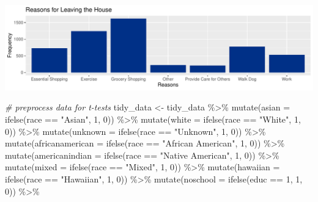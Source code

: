 \documentclass[
  11 pt,
]{article}
\newenvironment{Shaded}{\begin{snugshade}}{\end{snugshade}}
\newcommand{\AttributeTok}[1]{\textcolor[rgb]{0.77,0.63,0.00}{#1}}
\newcommand{\CommentTok}[1]{\textcolor[rgb]{0.56,0.35,0.01}{\textit{#1}}}
\newcommand{\DecValTok}[1]{\textcolor[rgb]{0.00,0.00,0.81}{#1}}
\newcommand{\FunctionTok}[1]{\textcolor[rgb]{0.00,0.00,0.00}{#1}}
\newcommand{\NormalTok}[1]{#1}
\newcommand{\OtherTok}[1]{\textcolor[rgb]{0.56,0.35,0.01}{#1}}
\newcommand{\SpecialCharTok}[1]{\textcolor[rgb]{0.00,0.00,0.00}{#1}}
\newcommand{\StringTok}[1]{\textcolor[rgb]{0.31,0.60,0.02}{#1}}
\begin{document}
\includegraphics{finalreport_template_files/figure-latex/data-analysis-3.pdf}

\begin{Shaded}
\begin{Highlighting}[]
\CommentTok{\# preprocess data for t{-}tests}
\NormalTok{tidy\_data }\OtherTok{\textless{}{-}}\NormalTok{ tidy\_data }\SpecialCharTok{\%\textgreater{}\%}
  \FunctionTok{mutate}\NormalTok{(}\AttributeTok{asian =} \FunctionTok{ifelse}\NormalTok{(race }\SpecialCharTok{==} \StringTok{"Asian"}\NormalTok{, }\DecValTok{1}\NormalTok{, }\DecValTok{0}\NormalTok{)) }\SpecialCharTok{\%\textgreater{}\%}
  \FunctionTok{mutate}\NormalTok{(}\AttributeTok{white =} \FunctionTok{ifelse}\NormalTok{(race }\SpecialCharTok{==} \StringTok{"White"}\NormalTok{, }\DecValTok{1}\NormalTok{, }\DecValTok{0}\NormalTok{)) }\SpecialCharTok{\%\textgreater{}\%}
  \FunctionTok{mutate}\NormalTok{(}\AttributeTok{unknown =} \FunctionTok{ifelse}\NormalTok{(race }\SpecialCharTok{==} \StringTok{"Unknown"}\NormalTok{, }\DecValTok{1}\NormalTok{, }\DecValTok{0}\NormalTok{)) }\SpecialCharTok{\%\textgreater{}\%}
  \FunctionTok{mutate}\NormalTok{(}\AttributeTok{africanamerican =} \FunctionTok{ifelse}\NormalTok{(race }\SpecialCharTok{==} \StringTok{"African American"}\NormalTok{, }\DecValTok{1}\NormalTok{, }\DecValTok{0}\NormalTok{)) }\SpecialCharTok{\%\textgreater{}\%}
  \FunctionTok{mutate}\NormalTok{(}\AttributeTok{americanindian =} \FunctionTok{ifelse}\NormalTok{(race }\SpecialCharTok{==} \StringTok{"Native American"}\NormalTok{, }\DecValTok{1}\NormalTok{, }\DecValTok{0}\NormalTok{)) }\SpecialCharTok{\%\textgreater{}\%}
  \FunctionTok{mutate}\NormalTok{(}\AttributeTok{mixed =} \FunctionTok{ifelse}\NormalTok{(race }\SpecialCharTok{==} \StringTok{"Mixed"}\NormalTok{, }\DecValTok{1}\NormalTok{, }\DecValTok{0}\NormalTok{)) }\SpecialCharTok{\%\textgreater{}\%}
  \FunctionTok{mutate}\NormalTok{(}\AttributeTok{hawaiian =} \FunctionTok{ifelse}\NormalTok{(race }\SpecialCharTok{==} \StringTok{"Hawaiian"}\NormalTok{, }\DecValTok{1}\NormalTok{, }\DecValTok{0}\NormalTok{)) }\SpecialCharTok{\%\textgreater{}\%}
  \FunctionTok{mutate}\NormalTok{(}\AttributeTok{noschool =} \FunctionTok{ifelse}\NormalTok{(educ }\SpecialCharTok{==} \DecValTok{1}\NormalTok{, }\DecValTok{1}\NormalTok{, }\DecValTok{0}\NormalTok{)) }\SpecialCharTok{\%\textgreater{}\%}

\end{Highlighting}
\end{Shaded}
\end{document}
